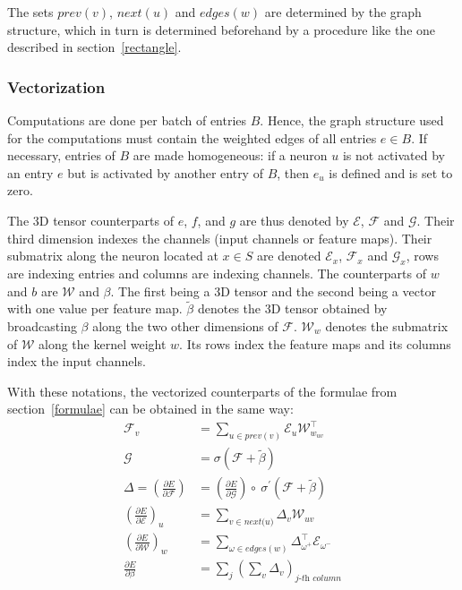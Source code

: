 The sets $\textit{prev}(v)$, $\textit{next}(u)$ and $\textit{edges}(\textit{w})$ are determined by the graph structure, which in turn is determined beforehand by a procedure like the one described in section~\ref{rectangle}.

  \subsubsection{Vectorization}

Computations are done per batch of entries $B$. Hence, the graph structure used for the computations must contain the weighted edges of all entries $e \in B$. If necessary, entries of $B$ are made homogeneous: if a neuron $u$ is not activated by an entry $e$ but is activated by another entry of $B$, then $e_u$ is defined and is set to zero.

The 3D tensor counterparts of $e$, $f$, and $g$ are thus denoted by $\mathscr{E}$, $\mathscr{F}$ and $\mathscr{G}$. Their third dimension indexes the channels (input channels or feature maps). Their submatrix along the neuron located at $x \in S$ are denoted $\mathscr{E}_x$, $\mathscr{F}_x$ and $\mathscr{G}_x$, rows are indexing entries and columns are indexing channels.
The counterparts of $\textit{w}$ and $b$ are $\mathscr{W}$ and $\beta$. The first being a 3D tensor and the second being a vector with one value per feature map. $\widetilde{\beta}$ denotes the 3D tensor obtained by broadcasting $\beta$ along the two other dimensions of $\mathscr{F}$. $\mathscr{W}_\textit{w}$ denotes the submatrix of $\mathscr{W}$ along the kernel weight $\textit{w}$. Its rows index the feature maps and its columns index the input channels.

With these notations, the vectorized counterparts of the formulae from section~\ref{formulae} can be obtained in the same way:
\begin{align}
\mathscr{F}_v &= \sum_{u \in \textit{prev}(v)}{\mathscr{E}_u\mathscr{W}_{\textit{w}_{uv}}^\top} \\
\mathscr{G} &= \sigma(\mathscr{F} + \widetilde{\beta}) \\
\Delta = \left(\frac{\partial{E}}{\partial{\mathscr{F}}}\right) &= \left(\frac{\partial{E}}{\partial{\mathscr{G}}}\right)\circ\ \sigma^{'}(\mathscr{F} + \widetilde{\beta}) \\
\left(\frac{\partial{E}}{\partial{\mathscr{E}}}\right)_u &= \sum_{v \in \textit{next(u)}}{\Delta_v\mathscr{W}_{uv}} \\
\left(\frac{\partial{E}}{\partial{\mathscr{W}}}\right)_\textit{w} &= \sum_{\omega \in \textit{edges}(\textit{w})}{\Delta_{\omega^+}^\top\mathscr{E}_{\omega^-}} \\
\frac{\partial{E}}{\partial{\beta}} &= \sum_{j}{\left(\sum_{v}{\Delta_v}\right)_{j\textit{-th column}}}
\end{align}

